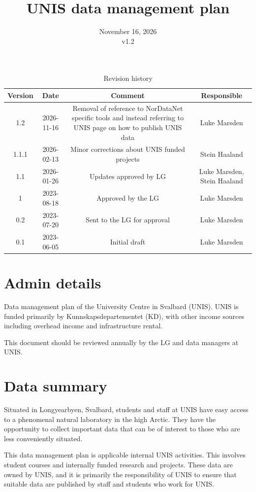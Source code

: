 \documentclass[a4paper,english, 11pt]{article}
\title{UNIS data management plan}
\date{November 16, 2026 \\v1.2}
\begin{document}
\maketitle
\begin{table}[b]
\centering
\caption{Revision history}
\begin{tabular}{cccc}
\toprule
Version & Date       & Comment                                      & Responsible \\
\midrule
1.2       & 2026-11-16 & Removal of reference to NorDataNet specific tools and instead referring to UNIS page on how to publish UNIS data & Luke Marsden      \\
1.1.1     & 2026-02-13 & Minor corrections about UNIS funded projects & Stein Haaland     \\
1.1       & 2026-01-26 & Updates approved by LG & Luke Marsden, Stein Haaland     \\
1       & 2023-08-18 & Approved by the LG & Luke Marsden     \\
0.2       & 2023-07-20 & Sent to the LG for approval & Luke Marsden     \\
0.1     & 2023-06-05 & Initial draft & Luke Marsden     \\
\bottomrule
\end{tabular}
\end{table}
\newpage
\tableofcontents
\newpage

\section{Admin details}
\label{s:admin}

Data management plan of the University Centre in Svalbard (UNIS). UNIS is funded primarily by Kunnskapsdepartementet (KD), with other income sources including overhead income and infrastructure rental.

This document should be reviewed annually by the LG and data managers at UNIS. 

\section{Data summary}
\label{s:data}

Situated in Longyearbyen, Svalbard, students and staff at UNIS have easy access to a phenomenal natural laboratory in the high Arctic. 
They have the opportunity to collect important data that can be of interest to those who are less conveniently situated.

This data management plan is applicable internal UNIS activities. This involves student courses and internally funded research and projects. These data are owned by UNIS, and it is primarily the responsibility of UNIS to ensure that suitable data are published by staff and students who work for UNIS. 
\end{document}
